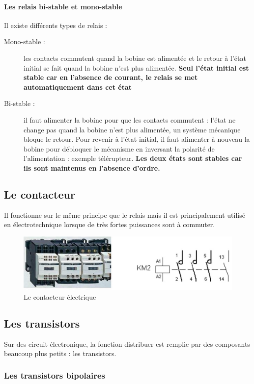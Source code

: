 \documentclass[10pt,fleqn]{article} %
\begin{document}
\paragraph{Les relais bi-stable et mono-stable}
Il existe différents types de relais :
\begin{description}
  \item [Mono-stable : ] les contacts commutent quand la bobine est alimentée et le retour à l'état initial se fait quand la bobine n'est plus alimentée. \textbf{Seul l'état initial est stable car en l'absence de courant, le relais se met automatiquement dans cet état}

  \item [Bi-stable : ] il faut alimenter la bobine pour que les contacts commutent : l'état ne change pas quand la bobine n'est plus alimentée, un système mécanique bloque le retour. Pour revenir à l'état initial, il faut alimenter à nouveau la bobine pour débloquer le mécanisme en inversant la polarité de l'alimentation : exemple télérupteur. \textbf{Les deux états sont stables car ils sont maintenus en l'absence d'ordre.}
\end{description}

\subsection{Le contacteur}
Il fonctionne sur le même principe que le relais mais il est principalement utilisé en électrotechnique lorsque de très fortes puissances sont à commuter.
\begin{figure}[h]
  \includegraphics[width=\textwidth]{images/contacteur}
  \caption{Le contacteur électrique}
  \label{fig:contacteur}
\end{figure}
\subsection{Les transistors}

Sur des circuit électronique, la fonction distribuer est remplie par des composants beaucoup plus petits : les transistors.
\subsubsection{Les transistors bipolaires}
\end{document}
